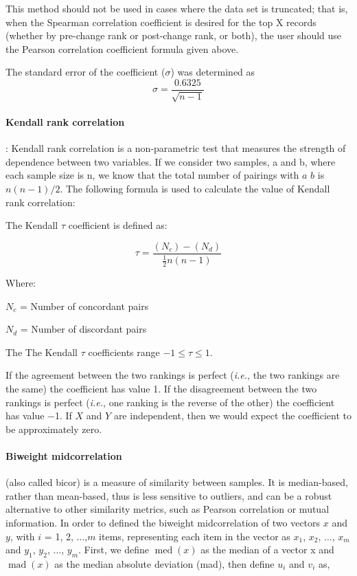 \documentclass[a4paper]{article}
\begin{document}
This method should not be used in cases where the data set is truncated; that is, when the Spearman correlation coefficient is desired for the top X records (whether by pre-change rank or post-change rank, or both), the user should use the Pearson correlation coefficient formula given above.

The standard error of the coefficient ($\sigma$) was determined as
\begin{equation}
\sigma = \frac{ 0.6325 }{\sqrt{n-1}}
\end{equation}
 
\paragraph{Kendall rank correlation}: Kendall rank correlation is a non-parametric test that measures the strength of dependence between two variables.  If we consider two samples, a and b, where each sample size is n, we know that the total number of pairings with $a$ $b$ is $n(n-1)/2$.  The following formula is used to calculate the value of Kendall rank correlation:

The Kendall $\tau$ coefficient is defined as:

\begin{equation}
\tau = \frac{(N_c) - (N_d)}{\frac{1}{2} n (n-1)}
\end{equation}

Where:

$N_c$ = Number of concordant pairs 

$N_d$ = Number of discordant pairs

The The Kendall $\tau$ coefficients range $ −1 \leq \tau \leq  1$.

If the agreement between the two rankings is perfect (\textit{i.e.}, the two rankings are the same) the coefficient has value 1.
If the disagreement between the two rankings is perfect (\textit{i.e.}, one ranking is the reverse of the other) the coefficient has value −1.
If $X$ and $Y$ are independent, then we would expect the coefficient to be approximately zero.

\paragraph{Biweight midcorrelation} (also called bicor) is a measure of similarity between samples. It is median-based, rather than mean-based, thus is less sensitive to outliers, and can be a robust alternative to other similarity metrics, such as Pearson correlation or mutual information.
In order to defined the biweight midcorrelation \citep{wilcox2012introduction} of two vectors $x$ and $y$, with $i$ = 1, 2, $\ldots$,$m$ items, representing each item in the vector as $x_{1}$, $x_{2}$, $\ldots$, $x_{m}$ and $y_{1}$, $y_{2}$, $\ldots$, $y_{m}$. First, we define $\operatorname{med}(x)$ as the median of a vector x and $\operatorname{mad}(x)$ as the median absolute deviation (mad), then define $u_{i}$ and $v_{i}$ as,
\end{document}
